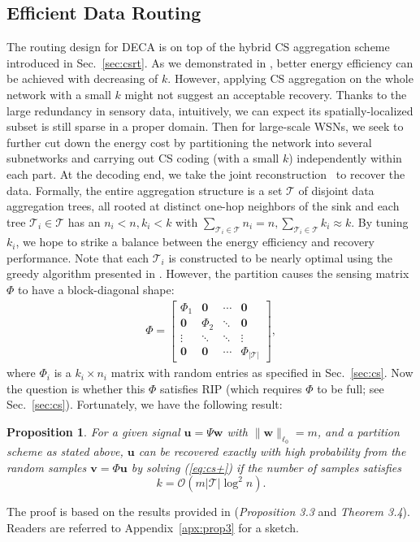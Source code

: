 \documentclass[conference]{IEEEtran}
\newtheorem{prop}{Proposition}
\begin{document}
  \subsection{Efficient Data Routing} \label{sec:routing}
The routing design for DECA is on top of the hybrid CS aggregation scheme introduced in Sec.~\ref{sec:csrt}. As we demonstrated in \cite{XiangLV-SECON11}, better energy efficiency can be achieved with decreasing of $k$. However, applying CS aggregation on the whole network with a small $k$ might not suggest an acceptable recovery. Thanks to the large redundancy in sensory data, intuitively, we can expect its spatially-localized subset is still sparse in a proper domain. Then for large-scale WSNs, we seek to further cut down the energy cost by partitioning the network into several subnetworks and carrying out CS coding (with a small $k$) independently within each part. At the decoding end, we take the joint reconstruction~\cite{LeePSKO-GSN09} to recover the data. Formally, the entire aggregation structure is a set $\mathcal{T}$ of disjoint data aggregation trees, all rooted at distinct one-hop neighbors of the sink and each tree $\mathcal{T}_i \in \mathcal{T}$ has an $n_i < n, k_i < k$ with $\sum_{\mathcal{T}_i \in \mathcal{T}} n_i = n, \sum_{\mathcal{T}_i \in \mathcal{T}} k_i \approx k$. By tuning $k_i$, we hope to strike a balance between the energy efficiency and recovery performance. Note that each $\mathcal{T}_i$ is constructed to be nearly optimal using the greedy algorithm presented in \cite{XiangLV-SECON11}. However, the partition causes the sensing matrix $\Phi$ to have a block-diagonal shape:
    \begin{eqnarray}
\Phi = \left[
                \begin{array}{cccc}
                  \Phi_1 & \mathbf{0} & \cdots & \mathbf{0} \\
                  \mathbf{0} & \Phi_2 & \ddots & \mathbf{0} \\
                  \vdots & \ddots & \ddots & \vdots \\
                  \mathbf{0} & \mathbf{0} & \cdots & \Phi_{|\mathcal{T}|}
               \end{array}
             \right], \nonumber
\end{eqnarray}
where $\Phi_i$ is a $k_i \times n_i$ matrix with random entries as specified in Sec.~\ref{sec:cs}. Now the question is whether this $\Phi$ satisfies RIP (which requires $\Phi$ to be full; see Sec.~\ref{sec:cs}). Fortunately, we have the following result:
    \begin{prop} \label{prop3}
       For a given signal $\mathbf{u}=\Psi\mathbf{w}$ with $\|\mathbf{w}\|_{\ell_0}=m$, and a partition scheme as stated above, $\mathbf{u}$ can be recovered exactly with high probability from the random samples $\mathbf{v}=\Phi\mathbf{u}$ by solving (\ref{eq:cs+}) if the number of samples satisfies \[k=\mathcal{O}(m|\mathcal{T}|\log^2n).\]
    \end{prop}
The proof is based on the results provided in \cite{LeeO-ASC10} (\textit{Proposition 3.3} and \textit{Theorem 3.4}). Readers are referred to Appendix~\ref{apx:prop3} for a sketch.
\end{document}
